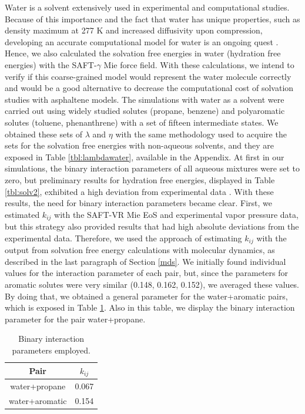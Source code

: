 \documentclass[final,12p,times,twocolumn]{elsarticle}
\begin{document}
	Water is a solvent extensively used in experimental and computational studies. Because of this importance and the fact that water has unique properties, such as density maximum at 277 K and increased diffusivity upon compression, developing an accurate computational model for water is an ongoing quest \cite{hadley2012}. Hence, we also calculated the solvation free energies in water (hydration free energies) with the SAFT-$\gamma$ Mie force field. With these calculations, we intend to verify if this coarse-grained model would represent the water molecule correctly and would be a good alternative to decrease the computational cost of solvation studies with asphaltene models. The simulations with water as a solvent were carried out using widely studied solutes (propane, benzene) and polyaromatic solutes (toluene, phenanthrene) with a set of fifteen intermediate states.  We obtained these sets of $\lambda$ and $\eta$ with the same methodology used to acquire the sets for the solvation free energies with non-aqueous solvents, and they are exposed in Table \ref{tbl:lambdawater}, available in the Appendix. At first in our simulations, the binary interaction parameters of all aqueous mixtures were set to zero, but preliminary results for hydration free energies, displayed in Table \ref{tbl:solv2},  exhibited a high deviation from experimental data \cite{P29900000291, doi:10.1021/ct050097l}. With these results, the need for binary interaction parameters became clear. First, we estimated $k_{ij}$ with the SAFT-VR Mie EoS and experimental vapor pressure data, but this strategy also provided results that had high absolute deviations from the experimental data. Therefore, we used the approach of estimating $k_{ij}$ with the output from solvation free energy calculations with molecular dynamics, as described in the last paragraph of Section \ref{mds}.  We initially found individual values for the interaction parameter of each pair, but, since the parameters for aromatic solutes were very similar (0.148, 0.162, 0.152), we averaged these values. By doing that,  we obtained a general parameter for the water+aromatic pairs, which is exposed in Table \ref{tbl:kij}. Also in this table, we display the binary interaction parameter for the pair water+propane. 
	
	\begin{table}
		\centering
		\caption{Binary interaction parameters employed.}
		\label{tbl:kij}
		\begin{tabular}{cc}
			\hline\hline
			Pair              & $k_{ij}$ \\ \hline
			water+propane  & 0.067    \\
			water+aromatic & 0.154    \\ \hline\hline
		\end{tabular}
	\end{table}
	
\end{document}
